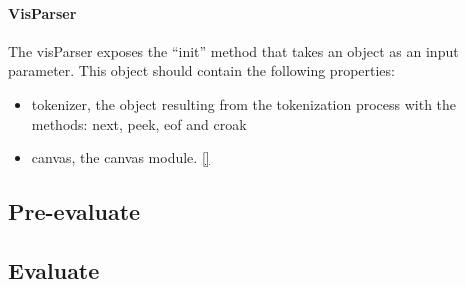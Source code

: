\paragraph{VisParser}
\label{sec:VisParser}

The visParser exposes the ``init'' method that takes an object as an input parameter. This object should contain the following properties:
\begin{itemize}
    \item tokenizer, the object resulting from the tokenization process with the methods: next, peek, eof and croak
    \item canvas, the canvas module. \ref{}
\end{itemize}


\subsection{Pre-evaluate}
\label{sec:PreEvaluate}

\subsection{Evaluate}
\label{sec:Eval}
